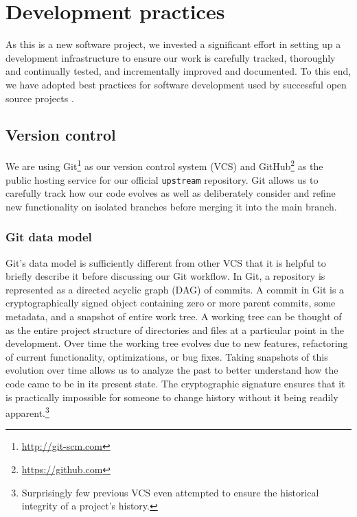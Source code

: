 \chapter{\label{ch:dev}Development practices}

As this is a new software project, we invested a significant effort in setting
up a development infrastructure to ensure our work is carefully tracked,
thoroughly and continually tested, and incrementally improved and documented.
To this end, we have adopted best practices for software development used by
successful open source projects \cite{millman2014}.

\section{\label{sec:vc}Version control}

We are using Git\footnote{\url{http://git-scm.com}} as our version control
system (VCS) and GitHub\footnote{\url{https://github.com}} as the public hosting
service for our official \texttt{upstream} repository.  Git allows us to
carefully track how our code evolves as well as deliberately consider and
refine new functionality on isolated branches before merging it into the main
branch.

\subsection{Git data model}

Git's data model is sufficiently different from other VCS that it is helpful to
briefly describe it before discussing our Git workflow.  In Git, a repository
is represented as a directed acyclic graph (DAG) of commits.  A commit in Git
is a cryptographically signed object containing zero or more parent commits,
some metadata, and a snapshot of entire work tree.  A working tree can be
thought of as the entire project structure of directories and files at a
particular point in the development.  Over time the working tree evolves due to
new features, refactoring of current functionality, optimizations, or bug
fixes.  Taking snapshots of this evolution over time allows us to analyze the
past to better understand how the code came to be in its present state.  The
cryptographic signature ensures that it is practically impossible for someone
to change history without it being readily apparent.\footnote{Surprisingly
few previous VCS even attempted to ensure the historical integrity of a
project's history.}

